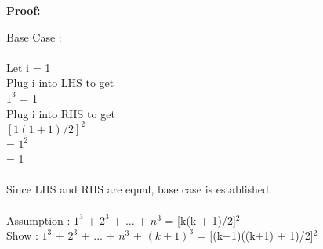 \documentclass[12pt]{article}
\begin{document}
\par
\bigskip
{\bf Proof:}
\par
Base Case : \\
\\
	Let i = 1 \\
	Plug i into LHS to get \\
	$1^{3}$ = 1 \\
	Plug i into RHS to get \\
	$[1(1 + 1)/2]^{2}$ \\
	= $1^{2}$\\
	= 1 \\
	\\
Since LHS and RHS are equal, base case is established. \\
\\

Assumption : $1^{3}$ + $2^{3}$ + ... + $n^{3}$ = [k(k + 1)/2]$^{2}$ \\
Show : $1^{3}$ + $2^{3}$ + ... + $n^{3}$ + $(k+1)^{3}$ = [(k+1)((k+1) + 1)/2]$^{2}$ \\
\end{document}
